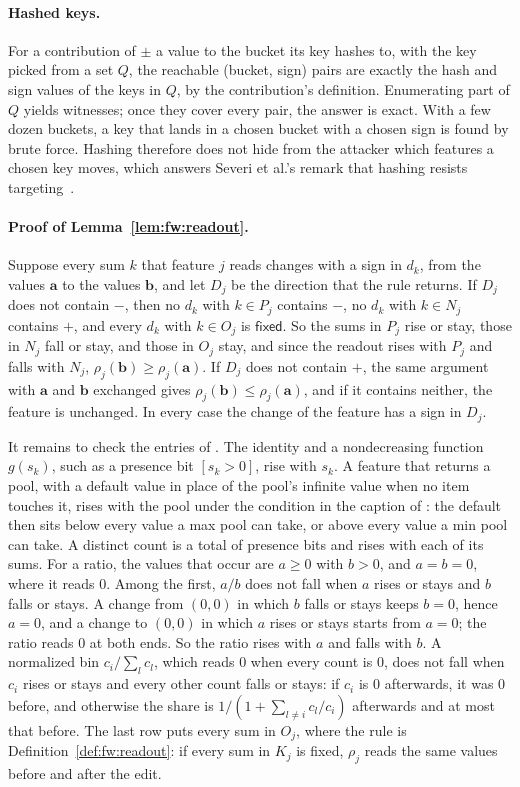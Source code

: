 \paragraph{Hashed keys.}
For a contribution of $\pm$ a value to the bucket its key hashes to, with the key picked from a set $Q$, the
reachable (bucket, sign) pairs are exactly the hash and sign values of the keys in $Q$, by the contribution's
definition. Enumerating part of $Q$ yields witnesses; once
they cover every pair, the answer is exact. With a few dozen buckets, a key that lands in a chosen bucket with a
chosen sign is found by brute force. Hashing therefore does not hide from the attacker which features a chosen key
moves, which answers Severi et al.'s remark that hashing resists targeting~\cite{severi2021explanation}.
\fi

\paragraph{Proof of Lemma~\ref{lem:fw:readout}.}
Suppose every sum $k$ that feature $j$ reads changes with a sign in $d_k$, from the values $\mathbf{a}$ to the values
$\mathbf{b}$, and let $D_j$ be the direction that the rule returns. If $D_j$ does not contain $-$, then no $d_k$ with
$k \in P_j$ contains $-$, no $d_k$ with $k \in N_j$ contains $+$, and every $d_k$ with $k \in O_j$ is
$\mathsf{fixed}$. So the sums in $P_j$ rise or stay, those in $N_j$ fall or stay, and those in $O_j$ stay, and since
the readout rises with $P_j$ and falls with $N_j$, $\rho_j(\mathbf{b}) \ge \rho_j(\mathbf{a})$. If $D_j$ does not
contain $+$, the same argument with $\mathbf{a}$ and $\mathbf{b}$ exchanged gives
$\rho_j(\mathbf{b}) \le \rho_j(\mathbf{a})$, and if it contains neither, the feature is unchanged. In every case the
change of the feature has a sign in $D_j$.

It remains to check the entries of . The identity and a nondecreasing function $g(s_k)$, such
as a presence bit $[s_k > 0]$, rise with $s_k$. A feature that returns a pool, with a default value in place of
the pool's infinite value when no item touches it, rises with the pool under the condition in the caption of
: the default then sits below every value a max pool can take, or above every value a min pool
can take. A distinct count is a total of presence bits and rises with each of its sums. For a ratio, the values that
occur are $a \ge 0$ with $b > 0$, and $a = b = 0$, where it reads 0. Among the first, $a/b$ does not fall when $a$
rises or stays and $b$ falls or stays. A change from $(0, 0)$ in which $b$ falls or stays keeps $b = 0$, hence
$a = 0$, and a change to $(0, 0)$ in which $a$ rises or stays starts from $a = 0$; the ratio reads 0 at both ends. So the ratio rises with $a$ and falls with $b$. A normalized bin
$c_i / \sum_l c_l$, which reads 0 when every count is 0, does not fall when $c_i$ rises or stays and every other
count falls or stays: if $c_i$ is 0 afterwards, it was 0 before, and otherwise the share is
$1 / (1 + \sum_{l \ne i} c_l / c_i)$ afterwards and at most that before. The last row puts every sum in $O_j$, where
the rule is Definition~\ref{def:fw:readout}: if every sum in $K_j$ is fixed, $\rho_j$ reads the same values before
and after the edit.

